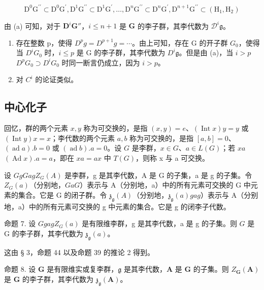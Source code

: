 \[
\mathrm{D} ^ {0} \mathrm{G} ^ {\prime \prime} \subset \mathrm{D} ^ {0} \mathrm{G} ^ {\prime}, \mathrm{D} ^ {1} \mathrm{G} ^ {\prime \prime} \subset \mathrm{D} ^ {1} \mathrm{G} ^ {\prime}, \dots , \mathrm{D} ^ {n} \mathrm{G} ^ {\prime \prime} \subset \mathrm{D} ^ {n} \mathrm{G} ^ {\prime}, \mathrm{D} ^ {n + 1} \mathrm{G} ^ {\prime \prime} \subset (\mathrm{H} _ {1}, \mathrm{H} _ {2})
\]

由 (a) 可知，对于 \(\mathbf{D}^i\mathbf{G}''\)，\(i\leqslant n + 1\) 是 \(\mathbf{G}\) 的李子群，其李代数为 \(\mathcal{D}^i\mathfrak{g}\)。

\begin{enumerate}
\def\labelenumi{(\alph{enumi})}
\setcounter{enumi}{2}
\item
  存在整数 p，使得 \(D^{p}g = D^{p+1}g = \cdots\)。由上可知，存在 G 的开子群 \(G_{0}\)，使得当 \(D^{i}G_{0}\) 时，\(i \leqslant p\) 是 G 的李子群，其李代数为 \(D^{i}\mathfrak{g}\)。但是由 (a)，当 \(i > p\)\(D^{p}G_{0} \supset D^{i}G_{0}\) 时同一断言仍成立，因为 \(i > p\)。
\item
  对 \(C^{i}\) 的论证类似。
\end{enumerate}

\subsection{中心化子}

回忆，群的两个元素 \(x, y\) 称为可交换的，是指 \((x, y) = e\)、\((\operatorname{Int} x)y = y\) 或 \((\operatorname{Int} y)x = x\)；李代数的两个元素 \(a, b\) 称为可交换的，是指 \([a, b] = 0\)、\((\operatorname{ad} a).b = 0\) 或 \((\operatorname{ad} b).a = 0\)。设 \(G\) 是李群，\(x \in G\)、\(a \in L(G)\)；若 \(x\)\(a\)\((\operatorname{Ad} x).a = a\)，即在 \(xa = ax\) 中 \(T(G)\)，则称 x 与 a 可交换。

设 \(G\)\(g\)\(G\)\(a\)\(g\)\(Z_{G}(A)\) 是李群，g 是其李代数，A 是 G 的子集，a 是 g 的子集。令 \(Z_{G}(a)\)（分别地，\(G\)\(a\)\(G\)）表示与 A（分别地，a）中的所有元素可交换的 G 中元素的集合。它是 G 的闭子群。令 \(\mathfrak{z}_{\mathfrak{g}}(A)\)（分别地，\(\mathfrak{z}_{\mathfrak{g}}(a)\)\(g\)\(a\)\(g\)）表示与 A（分别地，a）中的所有元素可交换的 g 中元素的集合。它是 g 的闭李子代数。

命题 7. 设 \(G\)\(g\)\(a\)\(g\)\(Z_G(a)\) 是有限维李群，g 是其李代数，a 是 g 的子集。则 \(G\) 是 G 的李子群，其李代数为 \(\mathfrak{z}_{\mathfrak{g}}(a)\)。

这由 § 3，命题 44 以及命题 39 的推论 2 得到。

命题 8. 设 \(\mathbf{G}\) 是有限维实或复李群，\(\mathfrak{g}\) 是其李代数，\(\mathbf{A}\) 是 \(\mathbf{G}\) 的子集。则 \(Z_{\mathbf{G}}(\mathbf{A})\) 是 \(\mathbf{G}\) 的李子群，其李代数为 \(\mathfrak{z}_{\mathfrak{g}}(\mathbf{A})\)。


